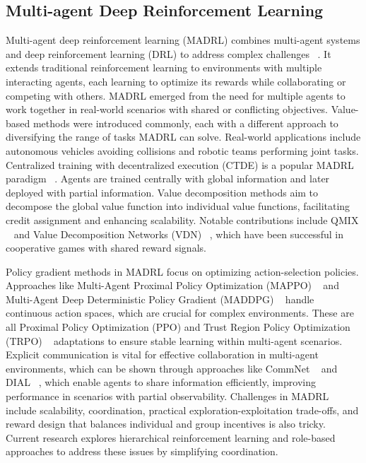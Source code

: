 \documentclass[sigconf]{aamas}
\begin{document}
\subsection{Multi-agent Deep Reinforcement Learning}
Multi-agent deep reinforcement learning (MADRL) combines multi-agent systems and deep reinforcement learning (DRL) to address complex challenges ~\cite{Foerster_Farquhar_Afouras_Nardelli_Whiteson_2018}. It extends traditional reinforcement learning to environments with multiple interacting agents, each learning to optimize its rewards while collaborating or competing with others. MADRL emerged from the need for multiple agents to work together in real-world scenarios with shared or conflicting objectives. Value-based methods were introduced commonly, each with a different approach to diversifying the range of tasks MADRL can solve. Real-world applications include autonomous vehicles avoiding collisions and robotic teams performing joint tasks. Centralized training with decentralized execution (CTDE) is a popular MADRL paradigm ~\cite{zhou2023centralizedtrainingdecentralizedexecution}. Agents are trained centrally with global information and later deployed with partial information. Value decomposition methods aim to decompose the global value function into individual value functions, facilitating credit assignment and enhancing scalability. Notable contributions include QMIX ~\cite{rashid2018qmixmonotonicvaluefunction} and Value Decomposition Networks (VDN) ~\cite{sunehag2017valuedecompositionnetworkscooperativemultiagent}, which have been successful in cooperative games with shared reward signals.

Policy gradient methods in MADRL focus on optimizing action-selection policies. Approaches like Multi-Agent Proximal Policy Optimization (MAPPO) ~\cite{yu2022surprisingeffectivenessppocooperative} and Multi-Agent Deep Deterministic Policy Gradient (MADDPG) ~\cite{lowe2020multiagentactorcriticmixedcooperativecompetitive} handle continuous action spaces, which are crucial for complex environments. These are all Proximal Policy Optimization (PPO) and Trust Region Policy Optimization (TRPO) ~\cite{schulman2017proximalpolicyoptimizationalgorithms} adaptations to ensure stable learning within multi-agent scenarios. Explicit communication is vital for effective collaboration in multi-agent environments, which can be shown through approaches like CommNet ~\cite{sukhbaatar2016learningmultiagentcommunicationbackpropagation} and DIAL ~\cite{foerster2016learningcommunicatedeepmultiagent}, which enable agents to share information efficiently, improving performance in scenarios with partial observability. Challenges in MADRL include scalability, coordination, practical exploration-exploitation trade-offs, and reward design that balances individual and group incentives is also tricky. Current research explores hierarchical reinforcement learning and role-based approaches to address these issues by simplifying coordination.
\end{document}
